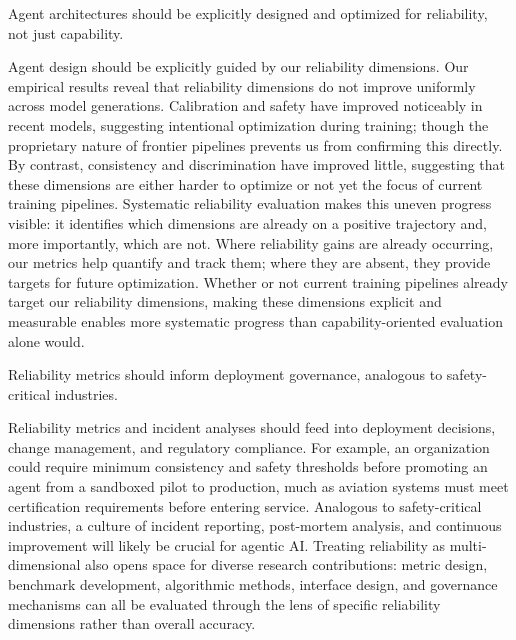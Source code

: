 \documentclass[11pt]{article}
\newcounter{dimension}
\begin{document}
\begin{claimbox}
Agent architectures should be explicitly designed and optimized for reliability, not just capability.
\end{claimbox}
Agent design should be explicitly guided by our reliability dimensions. Our empirical results reveal that reliability dimensions do not improve uniformly across model generations. Calibration and safety have improved noticeably in recent models, suggesting intentional optimization during training; though the proprietary nature of frontier pipelines prevents us from confirming this directly. By contrast, consistency and discrimination have improved little, suggesting that these dimensions are either harder to optimize or not yet the focus of current training pipelines. Systematic reliability evaluation makes this uneven progress visible: it identifies which dimensions are already on a positive trajectory and, more importantly, which are not. Where reliability gains are already occurring, our metrics help quantify and track them; where they are absent, they provide targets for future optimization.  Whether or not current training pipelines already target our reliability dimensions, making these dimensions explicit and measurable enables more systematic progress than capability-oriented evaluation alone would.

\begin{claimbox}
Reliability metrics should inform deployment governance, analogous to safety-critical industries.
\end{claimbox}
Reliability metrics and incident analyses should feed into deployment decisions, change management, and regulatory compliance. For example, an organization could require minimum consistency and safety thresholds before promoting an agent from a sandboxed pilot to production, much as aviation systems must meet certification requirements before entering service. Analogous to safety-critical industries, a culture of incident reporting, post-mortem analysis, and continuous improvement will likely be crucial for agentic AI. Treating reliability as multi-dimensional also opens space for diverse research contributions: metric design, benchmark development, algorithmic methods, interface design, and governance mechanisms can all be evaluated through the lens of specific reliability dimensions rather than overall accuracy.
\end{document}
